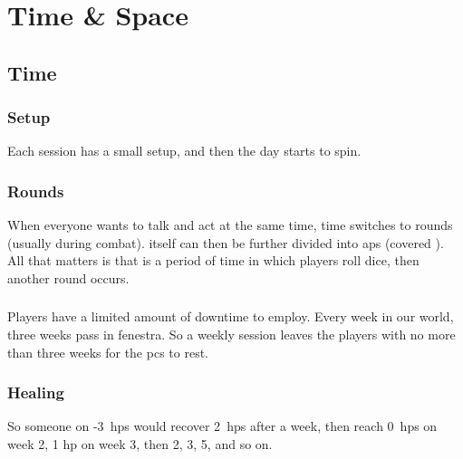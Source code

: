 \pagebreak[0]
\section{Time \& Space}

\begin{multicols}{2}

\subsection{Time}
\label{time}

\subsubsection{Setup}
Each session has a small setup, and then the day starts to spin.



\subsubsection{Rounds}

When everyone wants to talk and act at the same time, time switches to \glspl{round} (usually during combat).
 itself can then be further divided into \glspl{ap} (covered ).
All that matters is that  is a period of time in which players roll dice, then another \gls{round} occurs.

\subsubsection{}
\label{intervals}



\subsubsection{}

Players have a limited amount of \gls{downtime} to employ.
Every week in our world, three weeks pass in \gls{fenestra}.
So a weekly session leaves the players with no more than three weeks for the \glspl{pc} to rest.

\subsubsection{Healing}
\label{healing}

So someone on -3~\glspl{hp} would recover 2~\glspl{hp} after a week, then reach 0~\glspl{hp} on week 2, 1 \gls{hp} on week 3, then 2, 3, 5, and so on.


\end{multicols}
